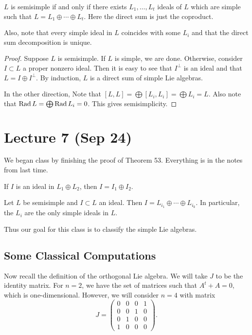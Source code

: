 \documentclass[twoside, 10pt]{article}
\begin{document}
    \begin{thm} $L$ is semisimple if and only if there exists $L_1, \ldots,
    L_t$ ideals of $L$ which are simple such that $L = L_1 \oplus \cdots \oplus
L_t$. Here the direct sum is just the coproduct.  \end{thm}

    Also, note that every simple ideal in $L$ coincides with some $L_i$ and
    that the direct sum decomposition is unique.

    \begin{proof} Suppose $L$ is semisimple. If $L$ is simple, we are done.
        Otherwise, consider $I \subset L$ a proper nonzero ideal. Then it is
        easy to see that $I^{\perp}$ is an ideal and that $L = I \oplus
        I^{\perp}$. By induction, $L$ is a direct sum of simple Lie algebras.

        In the other direction, Note that $[L,L] = \bigoplus [L_i,L_i] =
    \bigoplus L_i = L$. Also note that $\operatorname{Rad} L = \bigoplus \operatorname{Rad} L_i = 0$. This
gives semisimplicity.  \end{proof}

    \section{Lecture 7 (Sep 24)}%
    
    We began class by finishing the proof of Theorem 53. Everything is in the
    notes from last time.

    \begin{rmk} If $I$ is an ideal in $L_1 \oplus L_2$, then $I = I_1 \oplus
    I_2$.  \end{rmk}

    \begin{rmk} Let $L$ be semisimple and $I \subset L$ an ideal. Then $I =
    L_{i_1} \oplus \cdots \oplus L_{i_k}.$ In particular, the $L_i$ are the
only simple ideals in $L$.  \end{rmk}

    Thus our goal for this class is to classify the simple Lie algebras.
        
    \subsection{Some Classical Computations}%
    \label{sub:classical_lie_algebras}
    
    Now recall the definition of the orthogonal Lie algebra. We will take $J$
    to be the identity matrix. For $n = 2$, we have the set of matrices such
    that $A^t+A = 0$, which is one-dimensional. However, we will consider $n=4$
    with matrix \[ J = \begin{pmatrix} 0 & 0 & 0 & 1 \\ 0 & 0 & 1 & 0 \\ 0 & 1
    & 0 & 0 \\ 1 & 0 & 0 & 0 \end{pmatrix}. \]
\end{document}
